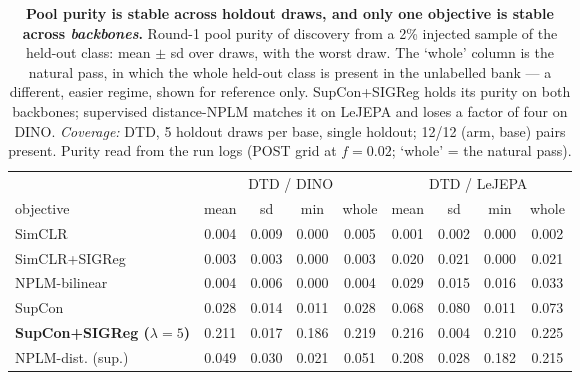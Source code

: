 \begin{table}[t]
\centering
\footnotesize
\begin{tabular}{lcccccccc}
\toprule
& \multicolumn{4}{c}{DTD / DINO} & \multicolumn{4}{c}{DTD / LeJEPA} \\
\cmidrule(lr){2-5}\cmidrule(lr){6-9}
objective & mean & sd & min & whole & mean & sd & min & whole \\
\midrule
SimCLR & 0.004 & 0.009 & 0.000 & 0.005 & 0.001 & 0.002 & 0.000 & 0.002 \\
SimCLR+SIGReg & 0.003 & 0.003 & 0.000 & 0.003 & 0.020 & 0.021 & 0.000 & 0.021 \\
NPLM-bilinear & 0.004 & 0.006 & 0.000 & 0.004 & 0.029 & 0.015 & 0.016 & 0.033 \\
SupCon & 0.028 & 0.014 & 0.011 & 0.028 & 0.068 & 0.080 & 0.011 & 0.073 \\
\textbf{SupCon+SIGReg ($\lambda{=}5$)} & 0.211 & 0.017 & 0.186 & 0.219 & 0.216 & 0.004 & 0.210 & 0.225 \\
NPLM-dist. (sup.) & 0.049 & 0.030 & 0.021 & 0.051 & 0.208 & 0.028 & 0.182 & 0.215 \\
\bottomrule
\end{tabular}
\caption{\textbf{Pool purity is stable across holdout draws, and only one objective is stable across \emph{backbones}.} Round-1 pool purity of discovery from a 2\% injected sample of the held-out class: mean $\pm$ sd over draws, with the worst draw. The `whole' column is the natural pass, in which the whole held-out class is present in the unlabelled bank --- a different, easier regime, shown for reference only. SupCon+SIGReg holds its purity on both backbones; supervised distance-NPLM matches it on LeJEPA and loses a factor of four on DINO. \emph{Coverage:} DTD, 5 holdout draws per base, single holdout; 12/12 (arm, base) pairs present. Purity read from the run logs (POST grid at $f=0.02$; `whole' = the natural pass).}
\label{tab:draws}
\end{table}
